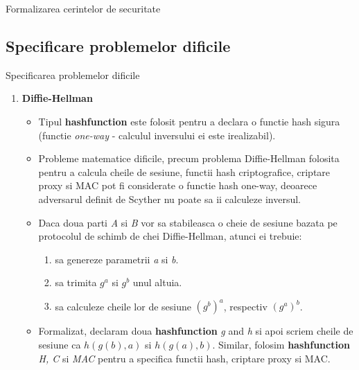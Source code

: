 \documentclass[11pt]{beamer}
\begin{document}
\begin{frame}[t,allowframebreaks]{Formalizarea cerintelor de securitate}
\begin{enumerate}
\begin{itemize}
	\end{itemize}

\end{enumerate}

\end{frame}

\subsection{Specificare problemelor dificile}

\begin{frame}[t,allowframebreaks]{Specificarea problemelor dificile}

\begin{enumerate}

\item \textbf{Diffie-Hellman}

	\begin{itemize}

	\item Tipul \textbf{hashfunction} este folosit pentru a declara o functie hash sigura (functie \textit{one-way} - calculul inversului ei este irealizabil).
	\item Probleme matematice dificile, precum problema Diffie-Hellman folosita pentru a calcula cheile de sesiune, functii hash criptografice, criptare proxy si MAC pot fi considerate o functie hash one-way, deoarece adversarul definit de Scyther nu poate sa ii calculeze inversul.
	\item Daca doua parti \textit{A} si \textit{B} vor sa stabileasca o cheie de sesiune bazata pe protocolul de schimb de chei Diffie-Hellman, atunci ei trebuie:
	\begin{enumerate}
		\item sa genereze parametrii \textit{a} si \textit{b}.
		\item sa trimita $g^a$ si $g^b$ unul altuia.
		\item sa calculeze cheile lor de sesiune $(g^b)^a$, respectiv $(g^a)^b$.
	\end{enumerate}
	
	\item Formalizat, declaram doua \textbf{hashfunction} \textit{g} and \textit{h} si apoi scriem cheile de sesiune ca $h(g(b),a)$ si $h(g(a),b)$. Similar, folosim \textbf{hashfunction} \textit{H, C} si \textit{MAC} pentru a specifica functii hash, criptare proxy si MAC.
	
	\end{itemize}
	

\end{enumerate}
\end{frame}
\end{document}
